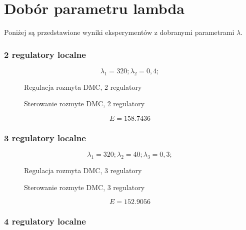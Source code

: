 \chapter{Dobór parametru lambda}

Poniżej są przedstawione wyniki eksperymentów z dobranymi parametrami $\lambda$.

\subsection{2 regulatory localne}

\begin{equation}
{\lambda}_1 = 320; {\lambda}_2 = 0,4;
\end{equation}

\begin{figure}[H]
\centering

\caption{Regulacja rozmyta DMC, 2 regulatory}
\end{figure}

\begin{figure}[H]
\centering

\caption{Sterowanie rozmyte DMC, 2 regulatory}
\end{figure}

\begin{equation}
    E = \num{158,7436}
\end{equation}

\subsection{3 regulatory localne}

\begin{equation}
{\lambda}_1 = 320; {\lambda}_2 = 40; {\lambda}_3 = 0,3;
\end{equation}

\begin{figure}[H]
\centering

\caption{Regulacja rozmyta DMC, 3 regulatory}
\end{figure}

\begin{figure}[H]
\centering

\caption{Sterowanie rozmyte DMC, 3 regulatory}
\end{figure}

\begin{equation}
    E = \num{152,9056}
\end{equation}

\subsection{4 regulatory localne}

